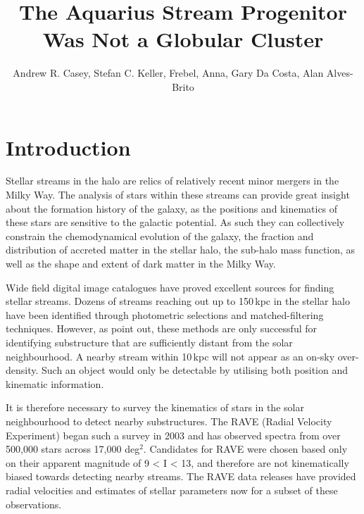 \documentclass{emulateapj}
\begin{document}
\title{The Aquarius Stream Progenitor Was Not a Globular Cluster}


\author{Andrew R. Casey, Stefan C. Keller, Frebel, Anna, Gary Da Costa, Alan Alves-Brito}


\begin{abstract}
\end{abstract}


\section{Introduction}

Stellar streams in the halo are relics of relatively recent minor mergers in the Milky Way. The analysis of stars within these streams can provide great insight about the formation history of the galaxy, as the positions and kinematics of these stars are sensitive to the galactic potential. As such they can collectively constrain the chemodynamical evolution of the galaxy, the fraction and distribution of accreted matter in the stellar halo, the sub-halo mass function, as well as the shape and extent of dark matter in the Milky Way. 

Wide field digital image catalogues have proved excellent sources for finding stellar streams. Dozens of streams reaching out up to 150\,kpc in the stellar halo have been identified through photometric selections and matched-filtering techniques. However, as \citet{Helmi;et-al_1999} point out, these methods are only successful for identifying substructure that are sufficiently distant from the solar neighbourhood. A nearby stream within 10\,kpc will not appear as an on-sky over-density. Such an object would only be detectable by utilising both position and kinematic information. 

It is therefore necessary to survey the kinematics of stars in the solar neighbourhood to detect nearby substructures. The RAVE (Radial Velocity Experiment) began such a survey in 2003 and has observed spectra from over 500,000 stars across 17,000 deg$^{2}$. Candidates for RAVE were chosen based only on their apparent magnitude of 9 < I < 13, and therefore are not kinematically biased towards detecting nearby streams. The RAVE data releases have provided radial velocities \citep{Steinmetz;et-al_2006} and estimates of stellar parameters \citep{Zwitter;et-al_2008, Siebert;et-al_2011} now for a subset of these observations. 
\end{document}

